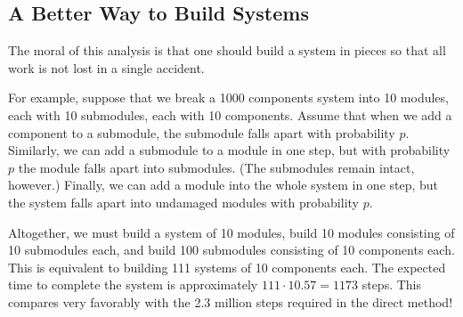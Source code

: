 \documentclass[11pt,twoside]{article}
\begin{document}
\subsection{A Better Way to Build Systems}

The moral of this analysis is that one should build a system in pieces
so that all work is not lost in a single accident.

For example, suppose that we break a 1000 components system into 10
modules, each with 10 submodules, each with 10 components.  Assume
that when we add a component to a submodule, the submodule falls apart
with probability $p$.  Similarly, we can add a submodule to a module
in one step, but with probability $p$ the module falls apart into
submodules.  (The submodules remain intact, however.)  Finally, we
can add a module into the whole system in one step, but the
system falls apart into undamaged modules with probability $p$.

Altogether, we must build a system of 10 modules, build 10 modules
consisting of 10 submodules each, and build 100 submodules consisting of
10 components each.  This is equivalent to building 111 systems of 10
components each.  The expected time to complete the system is
approximately $111 \cdot 10.57 = 1173$ steps.  This compares very
favorably with the 2.3 million steps required in the direct method!
\end{document}
